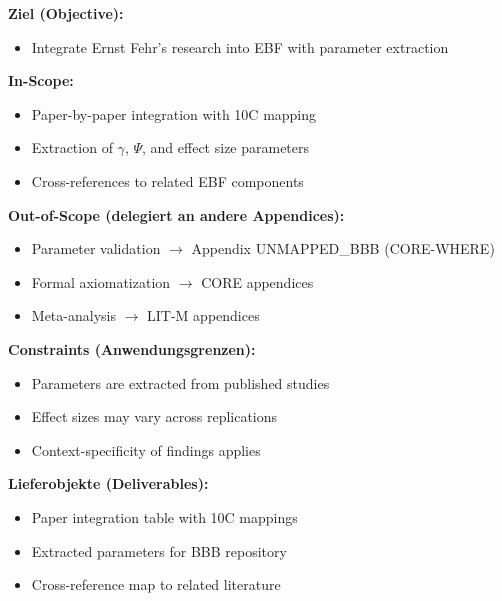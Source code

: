 
\begin{tcolorbox}[
    colback=orange!5!white,
    colframe=orange!75!black,
    title={\textbf{Appendix Scope: Ziel / In-Scope / Out-of-Scope / Constraints}},
    fonttitle=\bfseries
]

\textbf{Ziel (Objective):}
\begin{itemize}[nosep]
    \item Integrate Ernst Fehr's research into EBF with parameter extraction
\end{itemize}

\textbf{In-Scope:}
\begin{itemize}[nosep]
    \item Paper-by-paper integration with 10C mapping
    \item Extraction of $\gamma$, $\Psi$, and effect size parameters
    \item Cross-references to related EBF components
\end{itemize}

\textbf{Out-of-Scope (delegiert an andere Appendices):}
\begin{itemize}[nosep]
    \item Parameter validation $\rightarrow$ Appendix UNMAPPED_BBB (CORE-WHERE)
    \item Formal axiomatization $\rightarrow$ CORE appendices
    \item Meta-analysis $\rightarrow$ LIT-M appendices
\end{itemize}

\textbf{Constraints (Anwendungsgrenzen):}
\begin{itemize}[nosep]
    \item Parameters are extracted from published studies
    \item Effect sizes may vary across replications
    \item Context-specificity of findings applies
\end{itemize}

\textbf{Lieferobjekte (Deliverables):}
\begin{itemize}[nosep]
    \item Paper integration table with 10C mappings
    \item Extracted parameters for BBB repository
    \item Cross-reference map to related literature
\end{itemize}

\end{tcolorbox}

